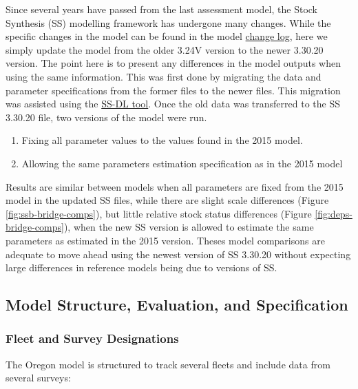 \documentclass[11pt,
  letterpaper,
]{article}
\providecommand{\tightlist}{%
  \setlength{\itemsep}{0pt}\setlength{\parskip}{0pt}}
\providecommand{\tightlist}{%
  \setlength{\itemsep}{0pt}\setlength{\parskip}{0pt}}
\begin{document}
Since several years have passed from the last assessment model, the Stock Synthesis (SS) modelling framework has undergone many changes. While the specific changes in the model can be found in the model \href{https://github.com/nmfs-stock-synthesis/stock-synthesis/blob/v3.30.19/Change_log_for_SS_3.30.xlsx?raw=true}{change log}, here we simply update the model from the older 3.24V version to the newer 3.30.20 version. The point here is to present any differences in the model outputs when using the same information. This was first done by migrating the data and parameter specifications from the former files to the newer files. This migration was assisted using the \href{https://github.com/shcaba/SS-DL-tool}{SS-DL tool}. Once the old data was transferred to the SS 3.30.20 file, two versions of the model were run.

\begin{enumerate}
\def\labelenumi{\arabic{enumi})}
\tightlist
\item
  Fixing all parameter values to the values found in the 2015 model.
\item
  Allowing the same parameters estimation specification as in the 2015 model
\end{enumerate}

Results are similar between models when all parameters are fixed from the 2015 model in the updated SS files, while there are slight scale differences (Figure \ref{fig:ssb-bridge-comps}), but little relative stock status differences (Figure \ref{fig:deps-bridge-comps}), when the new SS version is allowed to estimate the same parameters as estimated in the 2015 version. Theses model comparisons are adequate to move ahead using the newest version of SS 3.30.20 without expecting large differences in reference models being due to versions of SS.

\hypertarget{model-structure-evaluation-and-specification}{%
\subsection{Model Structure, Evaluation, and Specification}\label{model-structure-evaluation-and-specification}}

\hypertarget{fleet-and-survey-designations}{%
\subsubsection{Fleet and Survey Designations}\label{fleet-and-survey-designations}}

The Oregon model is structured to track several fleets and include data from several surveys:
\end{document}
